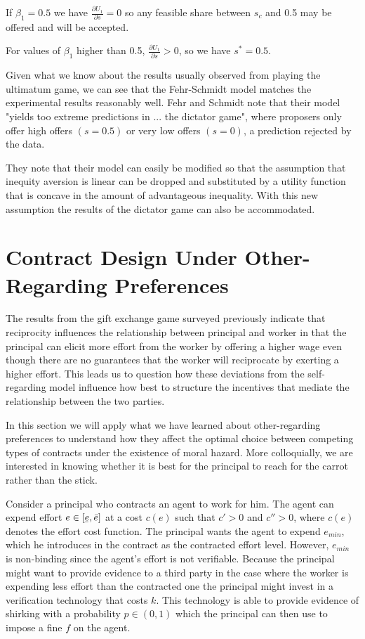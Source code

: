 \documentclass[12pt]{article}
\newcommand{\ubar}[1]{\underaccent{\bar}{#1}}
\begin{document}
If $\beta_1 = 0.5$ we have $\frac{\partial U_1}{\partial s}=0$ so any feasible share between $s_c$ and 0.5 may be offered and will be accepted.

For values of $\beta_1$ higher than 0.5, $\frac{\partial U_1}{\partial s}>0$, so we have $s^* = 0.5$.

Given what we know about the results usually observed from playing the ultimatum game, we can see that the Fehr-Schmidt model matches the experimental results reasonably well. Fehr and Schmidt note that their model "yields too extreme predictions in ... the dictator game", where proposers only offer high offers $\left(s = 0.5\right)$ or very low offers $\left(s = 0\right)$, a prediction rejected by the data. 

They note that their model can easily be modified so that the assumption that inequity aversion is linear can be dropped and substituted by a utility function that is concave in the amount of advantageous inequality. With this new assumption the results of the dictator game can also be accommodated. 

\section{Contract Design Under Other-Regarding Preferences}

The results from the gift exchange game surveyed previously indicate that reciprocity influences the relationship between principal and worker in that the principal can elicit more effort from the worker by offering a higher wage even though there are no guarantees that the worker will reciprocate by exerting a higher effort. This leads us to question how these deviations from the self-regarding model influence how best to structure the incentives that mediate the relationship between the two parties. 

In this section we will apply what we have learned about other-regarding preferences to understand how they affect the optimal choice between competing types of contracts under the existence of moral hazard. More colloquially, we are interested in knowing whether it is best for the principal to reach for the carrot rather than the stick.

Consider a principal who contracts an agent to work for him. The agent can expend effort $e \in \left[\ubar{e},\bar{e}\right]$ at a cost $c\left(e\right)$ such that ${c}'>0$ and ${c}''>0$, where $c(e)$ denotes the effort cost function. The principal wants the agent to expend $e_{min}$, which he introduces in the contract as the contracted effort level. However, $e_{min}$ is non-binding since the agent's effort is not verifiable. Because the principal might want to provide evidence to a third party in the case where the worker is expending less effort than the contracted one the principal might invest in a verification technology that costs $k$. This technology is able to provide evidence of shirking with a probability $p\in \left(0,1\right)$ which the principal can then use to impose a fine $f$ on the agent.
\end{document}

